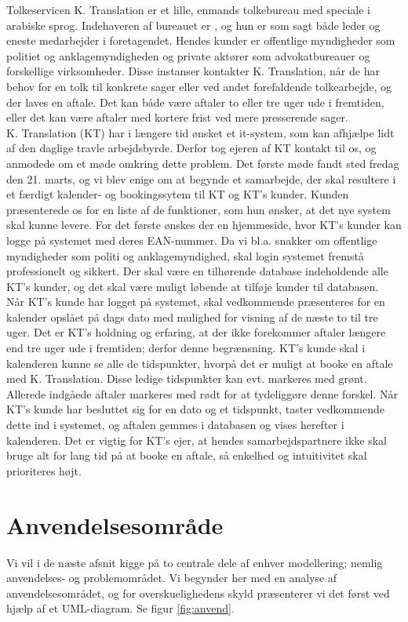 \documentclass[12pt]{article}
\begin{document}
Tolkeservicen K. Translation er et lille, enmands tolkebureau med speciale i arabiske 
sprog. Indehaveren af bureauet er , og hun er som sagt både leder og eneste
medarbejder i foretagendet. Hendes kunder er offentlige myndigheder som
politiet og anklagemyndigheden og private aktører som advokatbureauer og
forskellige virksomheder. Disse instanser kontakter K. Translation, når de har
behov for en tolk til konkrete sager eller ved andet forefaldende
tolkearbejde, og der laves en aftale. Det kan både være aftaler to eller tre uger 
ude i fremtiden, eller det kan være aftaler med kortere frist ved mere presserende 
sager.\\
K. Translation (KT) har i længere tid ønsket et it-system, som kan
afhjælpe lidt af den daglige travle arbejdsbyrde. Derfor tog ejeren af KT
kontakt til os, og anmodede om et møde omkring dette problem. Det første møde fandt 
sted fredag den 21. marts, og vi blev enige om at begynde et samarbejde, der
skal resultere i et færdigt kalender- og bookingssytem til KT og KT's kunder.
Kunden præsenterede os for en liste af de funktioner, som hun ønsker, at det nye system
skal kunne levere. For det første ønskes der en hjemmeside, hvor KT's kunder
kan logge på systemet med deres EAN-nummer. Da vi bl.a. snakker om offentlige
myndigheder som politi og anklagemyndighed, skal login systemet fremstå
professionelt og sikkert. Der skal være en tilhørende database indeholdende
alle KT's kunder, og det skal være muligt løbende at tilføje kunder til
databasen. \\
Når KT's kunde har logget på systemet, skal vedkommende præsenteres for en
kalender opslået på dags dato med mulighed for visning af de næste to til tre
uger. Det er KT's holdning og erfaring, at der ikke forekommer aftaler længere
end tre uger ude i fremtiden; derfor denne begrænsning. KT's kunde skal i
kalenderen kunne se alle de tidspunkter, hvorpå det er muligt at booke en
aftale med K. Translation. Disse ledige tidspunkter kan evt. markeres med
grønt. Allerede indgåede aftaler markeres med rødt for at tydeliggøre
denne forskel. Når KT's kunde har besluttet sig for en dato og et tidspunkt,
taster vedkommende dette ind i systemet, og aftalen gemmes i databasen og
vises herefter i kalenderen. Det er vigtig for KT's ejer, at hendes
samarbejdspartnere ikke skal bruge alt for lang tid på at booke en aftale, så
enkelhed og intuitivitet skal prioriteres højt.\\



\section{Anvendelsesområde}
Vi vil i de næste afsnit kigge på to centrale dele af enhver modellering;
nemlig anvendelses- og problemområdet. Vi begynder her med en analyse af
anvendelsesområdet, og for overskuelighedens skyld præsenterer vi det først
ved hjælp af et UML-diagram. Se figur \ref{fig:anvend}.\\
\end{document}
